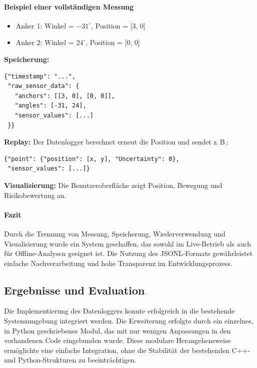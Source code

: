 \documentclass[a4paper, 12pt]{article} %
\begin{document}
\paragraph{Beispiel einer vollständigen Messung}

\begin{itemize}
    \item Anker 1: Winkel = \(-31^\circ\), Position = [3, 0]
    \item Anker 2: Winkel = \(24^\circ\), Position = [0, 0]
\end{itemize}

\textbf{Speicherung:}
\begin{verbatim}
{"timestamp": "...", 
 "raw_sensor_data": {
   "anchors": [[3, 0], [0, 0]], 
   "angles": [-31, 24], 
   "sensor_values": [...]
 }}
\end{verbatim}

\textbf{Replay:}  
Der Datenlogger berechnet erneut die Position und sendet z.\,B.:

\begin{verbatim}
{"point": {"position": [x, y], "Uncertainty": 0}, 
 "sensor_values": [...]}
\end{verbatim}

\textbf{Visualisierung:}  
Die Benutzeroberfläche zeigt Position, Bewegung und Risikobewertung an.

\paragraph{Fazit}

Durch die Trennung von Messung, Speicherung, Wiederverwendung und Visualisierung wurde ein System geschaffen, 
das sowohl im Live-Betrieb als auch für Offline-Analysen geeignet ist. Die Nutzung des JSONL-Formats gewährleistet einfache 
Nachverarbeitung und hohe Transparenz im Entwicklungsprozess.

\subsection{Ergebnisse und Evaluation}

Die Implementierung des Datenloggers konnte erfolgreich in die bestehende Systemumgebung integriert werden. Die Erweiterung 
erfolgte durch ein einzelnes, in Python geschriebenes Modul, das mit nur wenigen Anpassungen in den vorhandenen Code eingebunden wurde. 
Diese modulare Herangehensweise ermöglichte eine einfache Integration, ohne die Stabilität der bestehenden C++- und Python-Strukturen zu beeinträchtigen.
\end{document}
